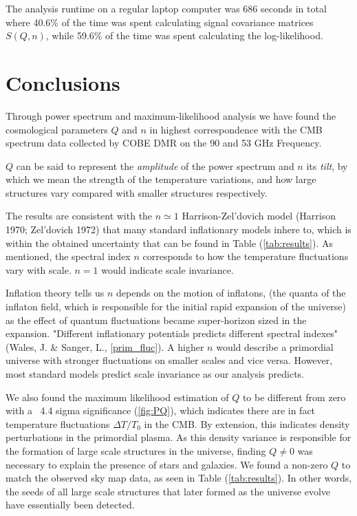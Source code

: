 \documentclass{emulateapj}
\begin{document}
The analysis runtime on a regular laptop computer was 686 seconds in total where 40.6\% of the time was spent calculating signal covariance matrices $S(Q,n)$, while 59.6\% of the time was spent calculating the log-likelihood. 
 


\section{Conclusions}
\label{sec:conclusions}

Through power spectrum and maximum-likelihood analysis we have found the cosmological parameters $Q$ and $n$ in highest correspondence with the CMB spectrum data collected by COBE DMR on the 90 and 53 GHz Frequency. 

$Q$ can be said to represent the \textit{amplitude} of the power spectrum and $n$ its \textit{tilt}, by which we mean the strength of the temperature variations, and how large structures vary compared with smaller structures respectively.

The results are consistent with the $n \simeq 1$ Harrison-Zel'dovich model (Harrison 1970; Zel'dovich 1972) that many standard inflationary models inhere to, which is within the obtained uncertainty that can be found in Table (\ref*{tab:results}). As mentioned, the spectral index $n$ corresponds to how the temperature fluctuations vary with scale. $n = 1$ would indicate scale invariance. 

Inflation theory tells us %
$n$ depends on the motion of inflatons, (the quanta of the inflaton field, which is responsible for the initial rapid expansion of the universe) as the effect of quantum fluctuations became super-horizon sized in the expansion. "Different inflationary potentials predicts different spectral indexes" (Wales, J. \& Sanger, L., \ref{prim_fluc}). A higher $n$ would describe a primordial universe with stronger fluctuations on smaller scales and vice versa. However, most standard models predict scale invariance as our analysis predicts.


We also found the maximum likelihood estimation of $Q$ to be different from zero with a ~4.4 sigma significance (\ref{fig:PQ}), which indicates there are in fact temperature fluctuations $\Delta T / T_0$ in the CMB. By extension, this indicates density perturbations in the primordial plasma. As this density variance is responsible for the formation of large scale structures in the universe, finding $Q \neq 0$ was necessary to explain the presence of stars and galaxies. We found a non-zero $Q$ to match the observed sky map data, as seen in Table (\ref{tab:results}). In other words, the seeds of all large scale structures that later formed as the universe evolve have essentially been detected.  
\end{document}
